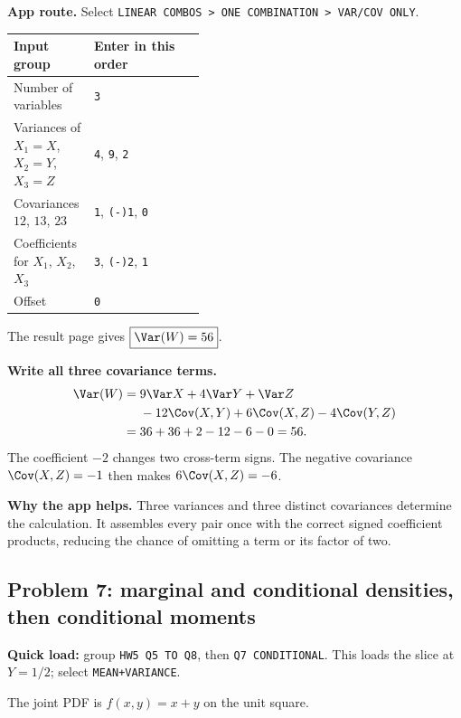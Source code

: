 \textbf{App route.} Select \texttt{LINEAR COMBOS > ONE COMBINATION > VAR/COV ONLY}.
\begin{center}
\begin{tabularx}{\linewidth}{@{}p{0.42\linewidth}X@{}}
\toprule Input group & Enter in this order\\\midrule
Number of variables & \texttt{3}\\
Variances of $X_1=X$, $X_2=Y$, $X_3=Z$ & \texttt{4}, \texttt{9}, \texttt{2}\\
Covariances $12$, $13$, $23$ & \texttt{1}, \texttt{(-)1}, \texttt{0}\\
Coefficients for $X_1$, $X_2$, $X_3$ & \texttt{3}, \texttt{(-)2}, \texttt{1}\\
Offset & \texttt{0}\\\bottomrule
\end{tabularx}
\end{center}
The result page gives $\boxed{\Var(W)=56}$.

\textbf{Write all three covariance terms.}
\[
\begin{aligned}
\Var(W)={}&9\Var X+4\Var Y+\Var Z\\
&-12\Cov(X,Y)+6\Cov(X,Z)-4\Cov(Y,Z)\\
={}&36+36+2-12-6-0=56.
\end{aligned}
\]
The coefficient $-2$ changes two cross-term signs. The negative covariance $\Cov(X,Z)=-1$ then makes $6\Cov(X,Z)=-6$.

\textbf{Why the app helps.} Three variances and three distinct covariances determine the calculation. It assembles every pair once with the correct signed coefficient products, reducing the chance of omitting a term or its factor of two.

\subsection{Problem 7: marginal and conditional densities, then conditional moments}
\textbf{Quick load:} group \texttt{HW5 Q5 TO Q8}, then \texttt{Q7 CONDITIONAL}. This loads the slice at $Y=1/2$; select \texttt{MEAN+VARIANCE}.

The joint PDF is $f(x,y)=x+y$ on the unit square.

